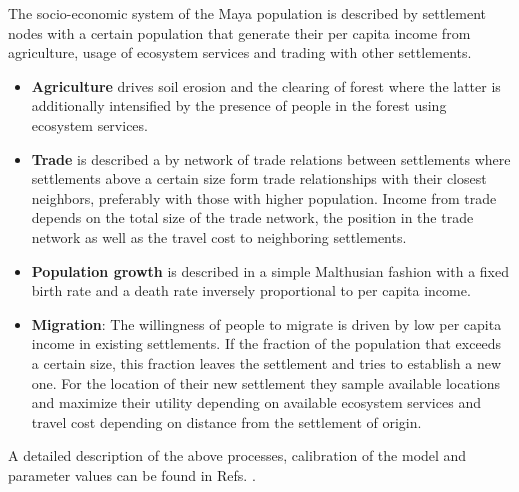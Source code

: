 The socio-economic system of the Maya population is described by settlement nodes with a certain population that generate their per capita income from agriculture, usage of ecosystem services and trading with other settlements. 

\begin{itemize}
	\item \textbf{Agriculture} drives soil erosion and the clearing of forest where the latter is additionally intensified by the presence of people in the forest using ecosystem services. 
	\item \textbf{Trade} is described a by network of trade relations between settlements where settlements above a certain size form trade relationships with their closest neighbors, preferably with those with higher population. Income from trade depends on the total size of the trade network, the position in the trade network as well as the travel cost to neighboring settlements.
        \item \textbf{Population growth} is described in a simple Malthusian fashion \citep{Malthus1872} with a fixed birth rate and a death rate inversely proportional to per capita income.
	\item \textbf{Migration}: The willingness of people to migrate is driven by low per capita income in existing settlements. If the fraction of the population that exceeds a certain size, this fraction leaves the settlement and tries to establish a new one. For the location of their new settlement they sample available locations and maximize their utility depending on available ecosystem services and travel cost depending on distance from the settlement of origin.
\end{itemize}
A detailed description of the above processes, calibration of the model and parameter values can be found in Refs. \cite{Heckbert2013, Heckbert2013model}.

